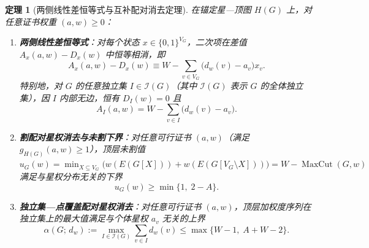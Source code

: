 \documentclass[11pt,a4paper]{ctexart}
\newtheorem{theorem}{定理}[section]
\theoremstyle{definition}
\newcommand{\Ind}{\mathcal I}
\newcommand{\1}{\boldsymbol 1}
\newcommand{\0}{\boldsymbol 0}
\begin{document}
\begin{theorem}[两侧线性差恒等式与互补配对消去定理]\label{thm:HG_identities}
在锚定星—顶图 $H(G)$ 上，对任意证书权重 $(a,w)\ge 0$：
\begin{enumerate}[label=(\alph*)]
\item \textbf{两侧线性差恒等式}：对每个状态 $x\in\{0,1\}^{V_G}$，二次项在差值 $A_x(a,w)-D_x(w)$ 中恒等相消，即
\begin{equation}\label{eq:linear_diff}
 \boxed{A_x(a,w) - D_x(w) \equiv W - \sum_{v\in V_G}\bigl(d_w(v)-a_v\bigr)x_v.}
\end{equation}
特别地，对 $G$ 的任意独立集 $I\in\Ind(G)$（其中 $\Ind(G)$ 表示 $G$ 的全体独立集），因 $I$ 内部无边，恒有 $D_I(w)=0$ 且
\begin{equation}\label{eq:ind_exact}
 \boxed{A_I(a,w) = W - \sum_{v\in I}\bigl(d_w(v)-a_v\bigr).}
\end{equation}
\item \textbf{割配对星权消去与未割下界}：对任意可行证书 $(a,w)$（满足 $g_{H(G)}(a,w)\ge 1$），顶层未割值 $u_G(w)=\min_{X\subseteq V_G}\bigl(w(E(G[X]))+w(E(G[V_G\setminus X]))\bigr)=W-\operatorname{MaxCut}(G,w)$ 满足与星权分布无关的下界
\begin{equation}\label{eq:uncut_duality}
 \boxed{u_G(w)\ge \min\{1,\; 2-A\}.}
\end{equation}
\item \textbf{独立集—点覆盖配对星权消去}：对任意可行证书 $(a,w)$，顶层加权度序列在独立集上的最大值满足与个体星权 $a_v$ 无关的上界
\begin{equation}\label{eq:alpha_deg_bound}
 \boxed{\alpha(G;\,d_w):=\max_{I\in\Ind(G)}\sum_{v\in I}d_w(v)\le \max\{W-1,\; A+W-2\}.}
\end{equation}
\end{enumerate}
\end{theorem}
\end{document}
